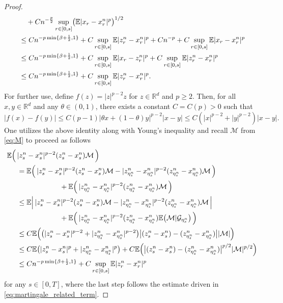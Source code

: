 \documentclass[reqno,  oneside, 12pt]{amsart}
\newcommand{\E}{\mathbb E}
\begin{document}
\begin{proof}
\begin{align*}
		&\quad+Cn^{-\frac{p}{2}}\sup_{ r\in[0,s]}\bigl(\E|x_r-x_r^n|^p\bigr)^{1/2}             \notag
		\\
		&\leq  Cn^{-p\min\{\beta+\frac{1}{2},1\}}+ C\sup_{ r\in[0,s]}\E|z_r^n-x_r^n|^p+Cn^{-{p}}+ C\sup_{ r\in[0,s]}\E|x_r-x_r^n|^p  \notag
		\\
		&\leq  Cn^{-p\min\{\beta+\frac{1}{2},1\}}+ C\sup_{ r\in[0,s]}\E|x_r-z_r^n|^p + C\sup_{ r\in[0,s]}\E|z_r^n-x_r^n|^p \notag
		\\
		&\leq  Cn^{-p\min\{\beta+\frac{1}{2},1\}}+ C\sup_{ r\in[0,s]}\E|z_r^n-x_r^n|^p. 
	\end{align*}
	For further use, define \( f(z) = |z|^{p-2} z \) for \( z \in \mathbb{R}^d \) and \( p \geq 2 \). Then, for all \( x, y \in \mathbb{R}^d \) and any \( \theta \in (0,1) \), there exists a constant \( C = C(p) > 0 \) such that
	\[
	| f(x) - f(y) | 
	\leq C (p - 1) \left| \theta x + (1 - \theta) y \right|^{p-2} | x - y |
	\leq C \left( |x|^{p-2} + |y|^{p-2} \right)| x - y |.
	\]
	One utilizes the above identity along with Young's inequality  and recall $\mathcal M$ from  \eqref{eq:M}  to proceed as follows
	\begin{align}
		\E\Big(\, &|z_s^n - x_s^n|^{p-2}(z_s^n - x_s^n)\mathcal M\,\Big)
		\notag
		\\
		&=\E\Big(\, |z_s^n - x_s^n|^{p-2}(z_s^n - x_s^n)\mathcal M - |z_{\eta_s^n}^n - x_{\eta_s^n}^n|^{p-2}(z_{\eta_s^n}^n - x_{\eta_s^n}^n)\mathcal M \,\Big) \notag
		\\
		&\qquad\qquad\qquad+\E\Big(\,|z_{\eta_s^n}^n - x_{\eta_s^n}^n|^{p-2}(z_{\eta_s^n}^n - x_{\eta_s^n}^n)\mathcal M \,\Big) \notag
		\\
		&\leq \E\Big|\, |z_s^n - x_s^n|^{p-2}(z_s^n - x_s^n)\mathcal M - |z_{\eta_s^n}^n - x_{\eta_s^n}^n|^{p-2}(z_{\eta_s^n}^n - x_{\eta_s^n}^n)\mathcal M \,\Big| \notag
		\\
		&\qquad\qquad\qquad+\E\Big(\,|z_{\eta_s^n}^n - x_{\eta_s^n}^n|^{p-2}(z_{\eta_s^n}^n - x_{\eta_s^n}^n)\E\big(\mathcal M|\mathcal G_{\eta^n_s}\big) \,\Big) \notag
		\\
		&\leq C\E\Big(\big( |z_s^n - x_s^n|^{p-2} + |z_{\eta_s^n}^n - x_{\eta_s^n}^n|^{p-2} \big)
		\big| (z_s^n - x_s^n)- (z_{\eta_s^n}^n - x_{\eta_s^n}^n) \big||\mathcal M|\Big)\notag
		\\
		&\leq C\E\big( |z_s^n - x_s^n|^{p} + |z_{\eta_s^n}^n - x_{\eta_s^n}^n|^{p} \big)+
		C\E  \Big(\big|(z_s^n-x_s^n)-(z_{\eta^n_s}^n-x_{\eta^n_s}^n)\big|^{p/2}|\mathcal M|^{p/2}\Big)\notag
		\\
		&\leq    Cn^{-p\min\{\beta+\frac{1}{2},1\}}+ C\sup_{ r\in[0,s]}\E|z_r^n-x_r^n|^p \label{eq:final_martingale_estimate}
	\end{align}
	for any $s\in[0,T]$, where the last step follows the estimate driven in \eqref{eq:martingale_related_term}.
	

\end{proof}
\end{document}

